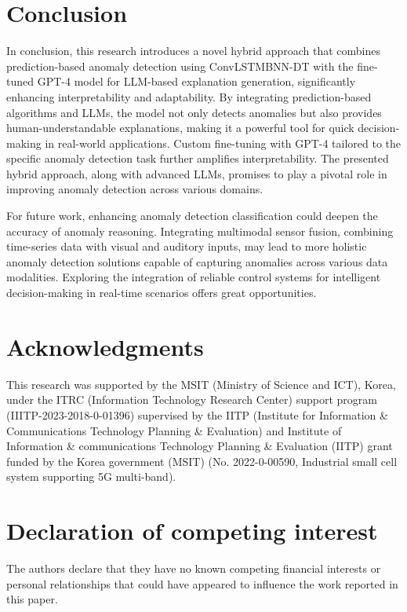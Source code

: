 \documentclass[final,3p,times,twocolumn]{elsarticle}
\begin{document}
\section{Conclusion}\label{sec5}
In conclusion, this research introduces a novel hybrid approach that combines prediction-based anomaly detection using ConvLSTMBNN-DT with the fine-tuned GPT-4 model for LLM-based explanation generation, significantly enhancing interpretability and adaptability. By integrating prediction-based algorithms and LLMs, the model not only detects anomalies but also provides human-understandable explanations, making it a powerful tool for quick decision-making in real-world applications. Custom fine-tuning with GPT-4 tailored to the specific anomaly detection task further amplifies interpretability. The presented hybrid approach, along with advanced LLMs, promises to play a pivotal role in improving anomaly detection across various domains.

For future work, enhancing anomaly detection classification could deepen the accuracy of anomaly reasoning. Integrating multimodal sensor fusion, combining time-series data with visual and auditory inputs, may lead to more holistic anomaly detection solutions capable of capturing anomalies across various data modalities. Exploring the integration of reliable control systems for intelligent decision-making in real-time scenarios offers great opportunities.

\section*{Acknowledgments}
This research was supported by the MSIT (Ministry of Science and ICT), Korea, under the ITRC (Information Technology Research Center) support program (IIITP-2023-2018-0-01396) supervised by the IITP (Institute for Information \& Communications Technology Planning \& Evaluation) and Institute of Information \& communications Technology Planning \& Evaluation (IITP) grant funded by the Korea government (MSIT) (No. 2022-0-00590, Industrial small cell system supporting 5G multi-band).

\section*{Declaration of competing interest}
The authors declare that they have no known competing financial interests or personal relationships that could have appeared to influence the work reported in this paper.
\end{document}
